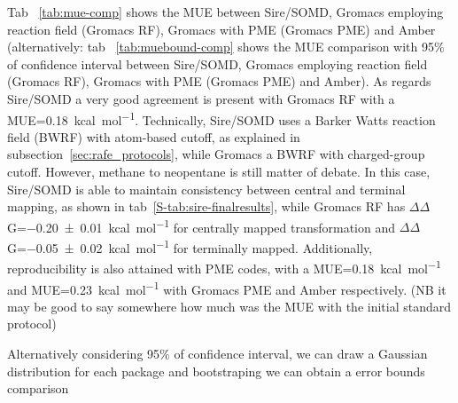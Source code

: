 \documentclass[journal=jctcce,manuscript=article]{achemso}
\begin{document}
Tab ~\ref{tab:mue-comp} shows the MUE between Sire/SOMD, Gromacs employing reaction field (Gromacs RF), Gromacs with PME (Gromacs PME) and Amber  (alternatively: tab ~\ref{tab:muebound-comp} shows the MUE comparison with 95$\%$ of confidence interval between Sire/SOMD, Gromacs employing reaction field (Gromacs RF), Gromacs with PME (Gromacs PME) and Amber). 
As regards Sire/SOMD a very good agreement is present with Gromacs RF with a MUE=\SI{0.18}{kcal.mol^{-1}}. Technically, Sire/SOMD uses a Barker Watts reaction field (BWRF) with atom-based cutoff, as explained in subsection~\ref{sec:rafe_protocols}, while Gromacs a BWRF with charged-group cutoff. 
However, methane to neopentane is still matter of debate. In this case, Sire/SOMD is able to maintain consistency between central and terminal mapping, as shown in tab~\ref{S-tab:sire-finalresults}, while Gromacs RF has $\Delta\Delta$G=\SI{-0.20 +- 0.01}{kcal.mol^{-1}} for centrally mapped transformation and $\Delta\Delta$G=\SI{-0.05 +- 0.02}{kcal.mol^{-1}} for terminally mapped.
Additionally, reproducibility is also attained with PME codes, with a MUE=\SI{0.18}{kcal.mol^{-1}} and MUE=\SI{0.23}{kcal.mol^{-1}} with Gromacs PME and Amber respectively. 
(NB it may be good to say somewhere how much was the MUE with the initial standard protocol)

\begin{table}[]
  \begin{minipage}{\linewidth}
  \caption{MUE comparison between Sire/SOMD, Gromacs with Reaction Field (Gromacs RF), Gromacs with PME (Gromacs PME) and Amber in terms of MUE (\SI{}{kcal.mol^{-1}}.}\label{tab:mue-comp}
  \end{minipage}
\end{table}

Alternatively considering 95$\%$ of confidence interval, we can draw a Gaussian distribution for each package and bootstraping we can obtain a error bounds comparison 
\end{document}
